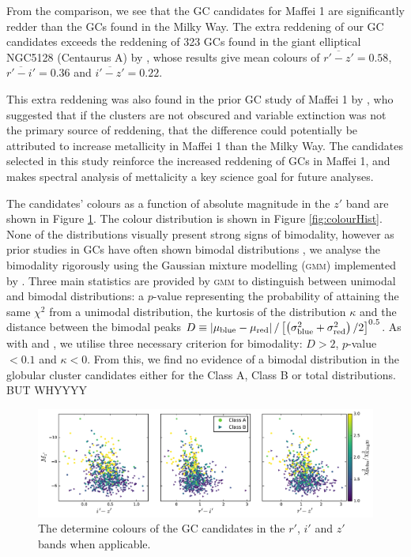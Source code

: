\documentclass[useAMS,usenatbib]{mn2e}
\begin{document}
 From the comparison, we see that the GC candidates for Maffei 1 are significantly redder than the GCs found in the Milky Way. The extra reddening of our GC candidates exceeds the reddening of 323 GCs found in the giant elliptical NGC5128 (Centaurus A) by \citet{Sinnott2010}, whose results give mean colours of $\overline{r'-z'} = 0.58$, $\overline{r'-i'} = 0.36$ and $\overline{i'-z'} = 0.22$.
 
 This extra reddening was also found in the prior GC study of Maffei 1 by \citet{buta03}, who suggested that if the clusters are not obscured and variable extinction was not the primary source of reddening, that the difference could potentially be attributed to increase metallicity in Maffei 1 than the Milky Way. The candidates selected in this study reinforce the increased reddening of GCs in Maffei 1, and makes spectral analysis of mettalicity a key science goal for future analyses.
 
 The candidates' colours as a function of absolute magnitude in the $z'$ band are shown in Figure \ref{fig:colour}. The colour distribution is shown in Figure \ref{fig:colourHist}. None of the distributions visually present strong signs of bimodality, however as prior studies in GCs have often shown bimodal distributions \citep{Dirsch2003, Salinas2015}, we analyse the bimodality rigorously using the Gaussian mixture modelling (\textsc{gmm}) implemented by \citet{Muratov2010}. Three main statistics are provided by \textsc{gmm} to distinguish between unimodal and bimodal distributions: a $p$-value representing the probability of attaining the same $\chi^2$ from a unimodal distribution, the kurtosis of the distribution $\kappa$ and the distance between the bimodal peaks $D \equiv \left| \mu_{\rm{blue}} - \mu_{\rm{red}}\right|/\left[ \left(\sigma^2_{\rm{blue}} + \sigma^2_{\rm{red}}\right)/2\right]^{0.5}$. As with \citet{Salinas2015} and \citet{Usher2012}, we utilise three necessary criterion for bimodality: $D>2$, $p$-value $ < 0.1$ and $\kappa < 0$. From this, we find no evidence of a bimodal distribution in the globular cluster candidates either for the Class A, Class B or total distributions. {\color{red} BUT WHYYYY}
 
 \begin{figure}
 	\includegraphics[width=\textwidth]{images/colour.pdf}
 	\caption{The determine colours of the GC candidates in the $r'$, $i'$ and $z'$ bands when applicable.}
 	\label{fig:colour}
 \end{figure}
 
\end{document}

